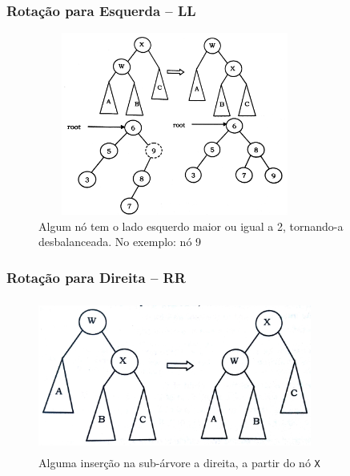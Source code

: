 
\begin{frame}
    \frametitle{Rotação para Esquerda -- LL }
      
 \begin{figure}[!ht]
     \centering
    \includegraphics[width=9cm, height=6cm]{figs/fig_arvores/avl01LL.jpg}

    \caption{Algum nó tem o lado esquerdo maior ou igual a 2, tornando-a desbalanceada. No exemplo: nó 9 }
    \end{figure}
\end{frame}


\begin{frame}
    \frametitle{Rotação para Direita -- RR }
   
   \begin{figure}[!ht]
     \centering
    \includegraphics[width=9cm, height=5cm]{figs/fig_arvores/avl02RR.jpg}

  \caption{Alguma inserção na sub-árvore a direita, a partir do nó \texttt{X}}
    \end{figure}
\end{frame}


